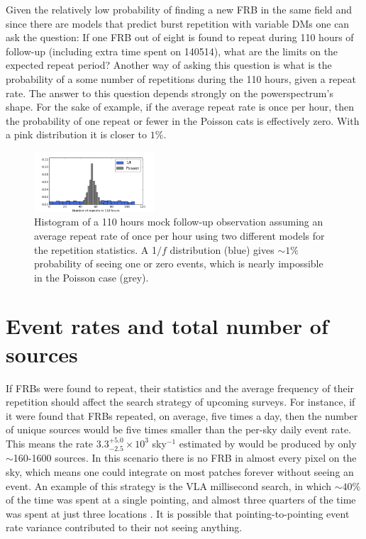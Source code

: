 \documentclass[useAMS,usenatbib]{mn2e}
\begin{document}
Given the relatively low probability of finding 
a new FRB in the same field and since there are models that predict
burst repetition with variable DMs \citep{2015arXiv150505535C, 2015arXiv150701002M}
one can ask the question: If one FRB out of eight is found to
repeat during 110 hours of follow-up (including extra time spent on 140514), 
what are the limits on the expected
repeat period? Another way of asking this question is what is the probability of 
a some number of repetitions during the 110 hours, given a repeat rate. The answer to 
this question depends strongly on the powerspectrum's shape. For the sake of example, if the average 
repeat rate is once per hour, then the probability of one repeat or fewer in the Poisson
cats is effectively zero. With a pink distribution it is closer to $1\%$. 


\begin{figure}
  \centering
   \includegraphics[trim={.5in, 0in, .5in, 0in}, width=0.4\textwidth, height=0.23\textwidth]{110_hours_followup.png}
   \caption{Histogram of a 110 hours mock follow-up observation assuming an average repeat rate of 
   once per hour using two different models 
   for the repetition statistics. A 1$/f$ distribution (blue) gives $\sim1\%$ probability of seeing one or zero events, 
   which is nearly impossible in the Poisson case (grey).}
   \label{FIG-hist}
\end{figure}


\section{Event rates and total number of sources}
\label{rate}

If FRBs were found to repeat, their statistics and the
average frequency of their repetition 
should affect the search strategy of upcoming surveys. 
For instance, if it were found that FRBs repeated,
on average, five times a day, then the number of unique 
sources would be five times smaller than the per-sky 
daily event rate. This means the rate 
$3.3^{+5.0}_{-2.5}\times10^3$ sky$^{-1}$ estimated by 
\cite{2015arXiv150500834R} would be produced by
only $\sim$160-1600 sources. In this scenario 
there is no FRB in almost every pixel on the sky, which means
one could integrate on most patches forever without 
seeing an event. An example of this strategy is the VLA millisecond search, 
in which $\sim40\%$ of the time was spent at a single pointing, and
almost three quarters of the time was spent at just three locations \citep{2015ApJ...807...16L}.
It is possible that pointing-to-pointing event rate variance contributed 
to their not seeing anything.
\end{document}
